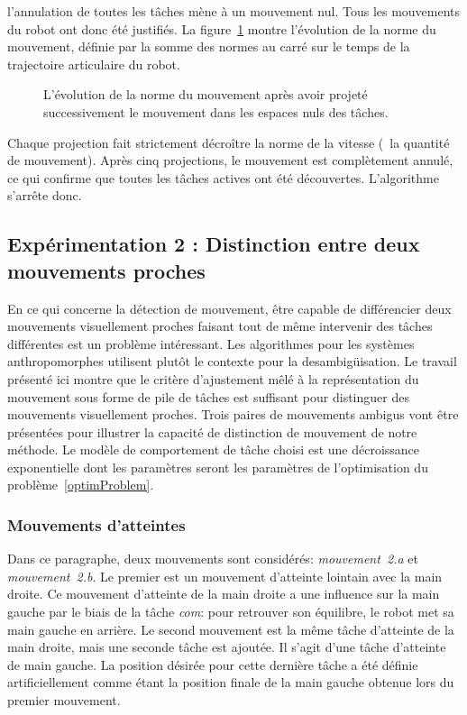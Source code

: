 l'annulation de toutes les t\^aches mène à un mouvement nul.
Tous les mouvements du robot ont donc été justifiés.
La figure~\ref{fig:xp3Pqdot} montre l'évolution de la norme du mouvement,
définie par la somme des normes au carré sur le temps de la trajectoire articulaire du robot.
\begin{figure}[t]
\begin{center}
\resizebox{.48\textwidth}{!} {
      
    }
\end{center}
\caption[Évolution de la norme du mouvement.]{L'évolution de la norme du mouvement après avoir projeté successivement le mouvement dans les
	espaces nuls des t\^aches.}
\label{fig:xp3Pqdot}
\end{figure}
Chaque projection fait strictement décroître la norme de la vitesse
(\ie~la quantité de mouvement). Après cinq projections, le mouvement est complètement
annulé, ce qui confirme que toutes les t\^aches actives ont été découvertes. L'algorithme
s'arrête donc.
\FloatBarrier

\subsection{Expérimentation 2 : Distinction entre deux mouvements proches}
\label{sec:distinc}
En ce qui concerne la détection de mouvement, \^etre capable
de différencier deux mouvements visuellement proches faisant tout de même
intervenir des t\^aches différentes est un problème intéressant.
Les algorithmes pour les systèmes anthropomorphes utilisent plut\^ot le contexte
pour la desambigüisation.
Le travail présenté ici montre que le critère d'ajustement mêlé à la représentation
du mouvement sous forme de pile de t\^aches est suffisant pour distinguer des mouvements visuellement
proches. Trois paires de mouvements ambigus vont \^etre présentées pour illustrer 
la capacité de distinction de mouvement de notre méthode.
Le modèle de comportement de t\^ache choisi est une décroissance exponentielle dont 
les paramètres seront les paramètres de l'optimisation du problème~\ref{optimProblem}.


\subsubsection{Mouvements d'atteintes}
\label{sec:distinc1}
Dans ce paragraphe, deux mouvements sont considérés: 
\emph{mouvement~2.a} et \emph{mouvement~2.b}.
Le premier est un mouvement d'atteinte lointain avec la main droite.
Ce mouvement d'atteinte de la main droite a une influence sur la main gauche par
le biais de la t\^ache \emph{com}: pour retrouver son équilibre,
le robot met sa main gauche en arrière.
Le second mouvement est la même t\^ache d'atteinte de la main droite, mais
une seconde t\^ache est ajoutée. Il s'agit d'une t\^ache d'atteinte de main gauche.
La position désirée pour cette dernière t\^ache a été définie artificiellement comme 
étant la position finale de la main gauche obtenue lors du premier mouvement.

